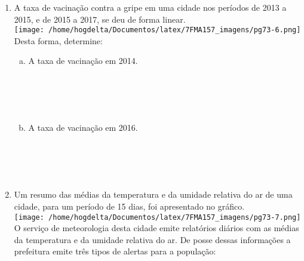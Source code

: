 \documentclass[a4paper,14pt]{article}
\begin{document}
\begin{multicols}{2}
\begin{enumerate}
			\item A taxa de vacinação contra a gripe em uma cidade nos períodos de 2013 a 2015, e de 2015 a 2017, se deu de forma linear. \\
			\texttt{[image: /home/hogdelta/Documentos/latex/7FMA157\_imagens/pg73-6.png]} \\
			Desta forma, determine:
			\begin{enumerate}[a)]
				\item A taxa de vacinação em 2014.\\\\\\\\\\
				\item A taxa de vacinação em 2016. \\\\\\\\\\
			\end{enumerate}
			\item Um resumo das médias da temperatura e da umidade relativa do ar de uma cidade, para um período de 15 dias, foi apresentado no gráfico.\\
			\texttt{[image: /home/hogdelta/Documentos/latex/7FMA157\_imagens/pg73-7.png]} \\
			
			O serviço de meteorologia desta cidade emite relatórios diários com as médias da temperatura e da umidade relativa do ar. De posse dessas informações a prefeitura emite três tipos de alertas para a população:
			

\end{enumerate}
\end{multicols}
\end{document}
